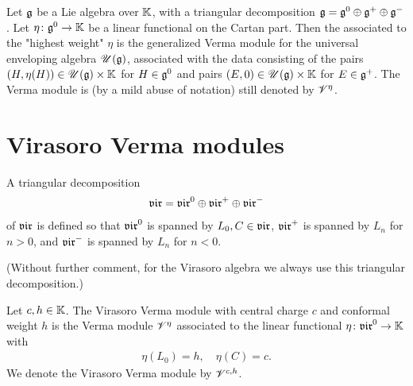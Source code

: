 \begin{definition}
  \label{def:LieVermaModule}
  \leanok
  Let $\mathfrak{g}$ be a Lie algebra over $\mathbb{K}$, with a triangular decomposition
  $\mathfrak{g} = \mathfrak{g}^0 \oplus \mathfrak{g}^+ \oplus \mathfrak{g}^-$.
  Let $\eta \colon \mathfrak{g}^0 \to \mathbb{K}$ be a linear functional on the Cartan
  part. Then the  associated to the "highest weight"
  $\eta$ is the generalized Verma module for the universal enveloping
  algebra $\mathscr{U}(\mathfrak{g})$, associated with the data
  consisting of the pairs
  $(H, \eta(H)) \in \mathscr{U}(\mathfrak{g}) \times \mathbb{K}$ for $H \in \mathfrak{g}^0$ and
  pairs $(E,0) \in \mathscr{U}(\mathfrak{g}) \times \mathbb{K}$ for $E \in \mathfrak{g}^+$.
  The Verma module is (by a mild abuse of notation)
  still denoted by $\mathscr{V}^{\eta}$.
\end{definition}


\section{Virasoro Verma modules}

\begin{definition}
  \label{def:VirasoroTriangular}
  \leanok
  A triangular decomposition
  \begin{align*}
    \mathfrak{vir} = \mathfrak{vir}^0 \oplus \mathfrak{vir}^+ \oplus \mathfrak{vir}^-
  \end{align*}
  of $\mathfrak{vir}$ is defined so that $\mathfrak{vir}^0$ is spanned by $L_0, C \in \mathfrak{vir}$,
  $\mathfrak{vir}^+$ is spanned by $L_n$ for $n > 0$,
  and $\mathfrak{vir}^-$ is spanned by $L_n$ for $n < 0$.

  (Without further comment, for the Virasoro algebra we always use this
  triangular decomposition.)
\end{definition}

\begin{definition}
  \label{def:VirasoroVermaModule}
  \leanok
  Let $c, h \in \mathbb{K}$.
  The Virasoro Verma module with central charge $c$ and conformal weight $h$
  is the Verma module $\mathscr{V}^{\eta}$ associated to the linear functional
  $\eta \colon \mathfrak{vir}^0 \to \mathbb{K}$ with
  \begin{align*}
    \eta(L_0) = h, \quad \eta(C) = c .
  \end{align*}
  We denote the Virasoro Verma module by $\mathscr{V}^{c,h}$.
\end{definition}
